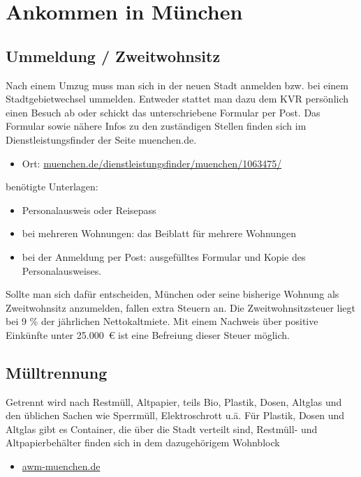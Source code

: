 ﻿
\section{Ankommen in München}

\subsection{Ummeldung / Zweitwohnsitz}

Nach einem Umzug muss man sich in der neuen Stadt anmelden bzw. bei einem Stadtgebietwechsel ummelden. Entweder stattet man dazu dem KVR persönlich einen Besuch ab oder schickt das unterschriebene Formular per Post. Das Formular sowie nähere Infos zu den zuständigen Stellen finden sich im Dienstleistungsfinder der Seite muenchen.de.

\begin{itemize}
	\item Ort: \url{muenchen.de/dienstleistungsfinder/muenchen/1063475/}
\end{itemize}

benötigte Unterlagen:
\begin{itemize}
	\item Personalausweis oder Reisepass 
	\item bei mehreren Wohnungen: das Beiblatt für mehrere Wohnungen
	\item bei der Anmeldung per Post: ausgefülltes Formular und Kopie des Personalausweises.
\end{itemize}

Sollte man sich dafür entscheiden, München oder seine bisherige Wohnung als Zweitwohnsitz anzumelden, fallen extra Steuern an. Die Zweitwohnsitzsteuer liegt bei 9 \% der jährlichen Nettokaltmiete. Mit einem Nachweis über positive Einkünfte unter 25.000~€ ist eine Befreiung dieser Steuer möglich.

\subsection{Mülltrennung}
Getrennt wird nach Restmüll, Altpapier, teils Bio, Plastik, Dosen, Altglas und den üblichen Sachen wie Sperrmüll, Elektroschrott u.ä.
Für Plastik, Dosen und Altglas gibt es Container, die über die Stadt verteilt sind, Restmüll- und Altpapierbehälter finden sich in dem dazugehörigem Wohnblock
\begin{itemize}
	\item \url{awm-muenchen.de}
\end{itemize}

